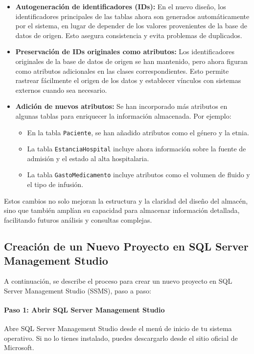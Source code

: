 \documentclass{article}
\begin{document}
\begin{itemize}
	\item \textbf{Autogeneración de identificadores (IDs):} En el nuevo diseño, los identificadores principales de las tablas ahora son generados automáticamente por el sistema, en lugar de depender de los valores provenientes de la base de datos de origen. Esto asegura consistencia y evita problemas de duplicados.
	
	\item \textbf{Preservación de IDs originales como atributos:} Los identificadores originales de la base de datos de origen se han mantenido, pero ahora figuran como atributos adicionales en las clases correspondientes. Esto permite rastrear fácilmente el origen de los datos y establecer vínculos con sistemas externos cuando sea necesario.
	
	\item \textbf{Adición de nuevos atributos:} Se han incorporado más atributos en algunas tablas para enriquecer la información almacenada. Por ejemplo:
	\begin{itemize}
		\item En la tabla \texttt{Paciente}, se han añadido atributos como el género y la etnia.
		\item La tabla \texttt{EstanciaHospital} incluye ahora información sobre la fuente de admisión y el estado al alta hospitalaria.
		\item La tabla \texttt{GastoMedicamento} incluye atributos como el volumen de fluido y el tipo de infusión.
	\end{itemize}
\end{itemize}

Estos cambios no solo mejoran la estructura y la claridad del diseño del almacén, sino que también amplían su capacidad para almacenar información detallada, facilitando futuros análisis y consultas complejas.


\subsection{Creación de un Nuevo Proyecto en SQL Server Management Studio}

A continuación, se describe el proceso para crear un nuevo proyecto en SQL Server Management Studio (SSMS), paso a paso:

\paragraph{Paso 1: Abrir SQL Server Management Studio}  
Abre SQL Server Management Studio desde el menú de inicio de tu sistema operativo. Si no lo tienes instalado, puedes descargarlo desde el sitio oficial de Microsoft.
\end{document}
